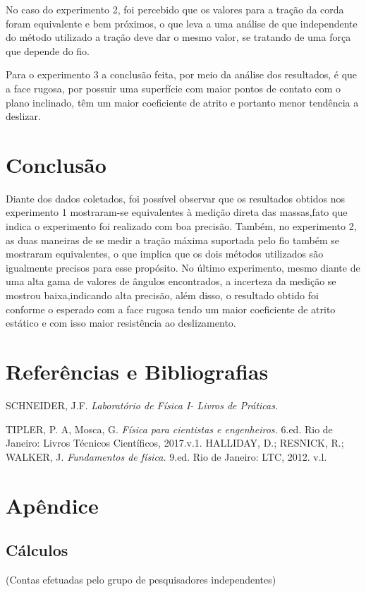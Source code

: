 \documentclass[12pt, letterpaper]{article}
\begin{document}
No caso do experimento 2, foi percebido que os valores para a tração da corda foram equivalente e bem próximos, o que leva a uma análise de que independente do método utilizado a tração deve dar o mesmo valor, se tratando de uma força que depende do fio.


Para o experimento 3 a conclusão feita, por meio da análise dos resultados, é que a face rugosa, por possuir uma superfície com maior pontos de contato com o plano inclinado, têm um maior coeficiente de atrito e portanto menor tendência a deslizar. 

\section{Conclusão}
Diante dos dados coletados, foi possível observar que os resultados obtidos nos experimento 1 mostraram-se equivalentes à medição direta das massas,fato que indica o experimento foi realizado com boa precisão. Também, no experimento 2, as duas maneiras de se medir a tração máxima suportada pelo fio também se mostraram equivalentes, o que implica que os dois métodos utilizados são igualmente precisos para esse propósito. No último experimento, mesmo diante de uma alta gama de valores de ângulos encontrados, a  incerteza da medição se mostrou baixa,indicando alta precisão, além disso, o resultado obtido foi conforme o esperado com a face rugosa tendo um maior coeficiente de atrito estático e com isso maior resistência ao deslizamento.
\section{Referências e Bibliografias}

\begin{thebibliography}{2}

SCHNEIDER, J.F. \emph{Laboratório de Física I- Livros de Práticas.}


TIPLER, P. A, Mosca, G. \emph{Física para cientistas e engenheiros.} 6.ed. Rio de Janeiro: Livros Técnicos Científicos, 2017.v.1.
HALLIDAY, D.; RESNICK, R.; WALKER, J. \emph{Fundamentos de física.} 9.ed. Rio de Janeiro: LTC, 2012. v.l.
\end{thebibliography}
\section{Apêndice}
\subsection{Cálculos}
(Contas efetuadas pelo grupo de pesquisadores independentes)
\end{document}
